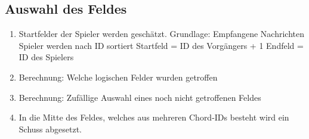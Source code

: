 \documentclass[a4paper]{article}
\begin{document}
\subsection{Auswahl des Feldes}
\begin{enumerate}
	\item Startfelder der Spieler werden geschätzt. Grundlage: Empfangene Nachrichten
		\subitem Spieler werden nach ID sortiert
		\subitem Startfeld = ID des Vorgängers + 1
		\subitem Endfeld = ID des Spielers
	\item Berechnung: Welche logischen Felder wurden getroffen
	\item Berechnung: Zufällige Auswahl eines noch nicht getroffenen Feldes
	\item In die Mitte des Feldes, welches aus mehreren Chord-IDs besteht wird ein Schuss abgesetzt.
\end{enumerate}
\end{document}
